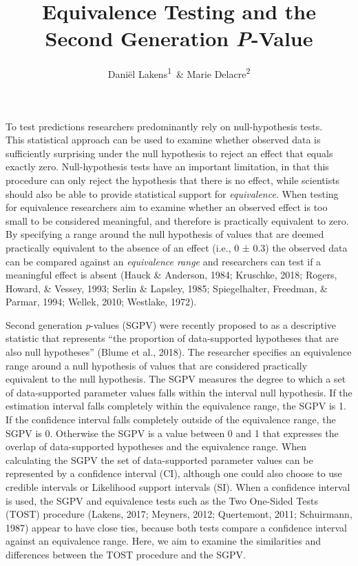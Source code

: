 \documentclass[,man,floatsintext]{apa6}
\title{Equivalence Testing and the Second Generation \emph{P}-Value}
\author{Daniël Lakens\textsuperscript{1}~\& Marie Delacre\textsuperscript{2}}
\date{}
\affiliation{
\vspace{0.5cm}
\textsuperscript{1} Eindhoven University of Technology, Eindhoven, The Netherlands\\\textsuperscript{2} Service of Analysis of the Data, Université Libre de Bruxelles, Belgium}
\begin{document}
\maketitle

To test predictions researchers predominantly rely on null-hypothesis tests.\\
This statistical approach can be used to examine whether observed data is sufficiently surprising under the null hypothesis to reject an effect that equals exactly zero.
Null-hypothesis tests have an important limitation, in that this procedure can only reject the hypothesis that there is no effect, while scientists should also be able to provide statistical support for \emph{equivalence}.
When testing for equivalence researchers aim to examine whether an observed effect is too small to be considered meaningful, and therefore is practically equivalent to zero.
By specifying a range around the null hypothesis of values that are deemed practically equivalent to the absence of an effect (i.e., 0 ± 0.3) the observed data can be compared against an \emph{equivalence range} and researchers can test if a meaningful effect is absent (Hauck \& Anderson, 1984; Kruschke, 2018; Rogers, Howard, \& Vessey, 1993; Serlin \& Lapsley, 1985; Spiegelhalter, Freedman, \& Parmar, 1994; Wellek, 2010; Westlake, 1972).

Second generation \emph{p}-values (SGPV) were recently proposed to as a descriptive statistic that represents \enquote{the proportion of data-supported hypotheses that are also null hypotheses} (Blume et al., 2018).
The researcher specifies an equivalence range around a null hypothesis of values that are considered practically equivalent to the null hypothesis.
The SGPV measures the degree to which a set of data-supported parameter values falls within the interval null hypothesis.
If the estimation interval falls completely within the equivalence range, the SGPV is 1.
If the confidence interval falls completely outside of the equivalence range, the SGPV is 0. Otherwise the SGPV is a value between 0 and 1 that expresses the overlap of data-supported hypotheses and the equivalence range.
When calculating the SGPV the set of data-supported parameter values can be represented by a confidence interval (CI), although one could also choose to use credible intervals or Likelihood support intervals (SI).
When a confidence interval is used, the SGPV and equivalence tests such as the Two One-Sided Tests (TOST) procedure (Lakens, 2017; Meyners, 2012; Quertemont, 2011; Schuirmann, 1987) appear to have close ties, because both tests compare a confidence interval against an equivalence range.
Here, we aim to examine the similarities and differences between the TOST procedure and the SGPV.
\end{document}

